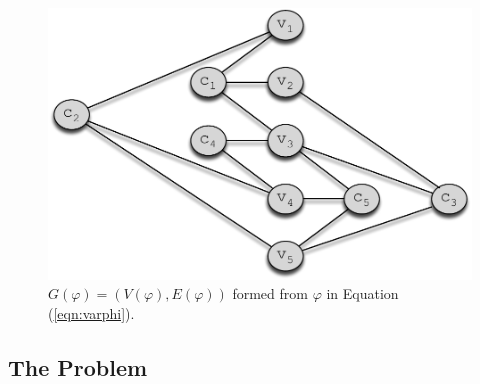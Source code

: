 \begin{figure}[t]
\centering
\includegraphics[scale=0.53]{figs/gvarphi.pdf}
\caption{$G(\varphi)=(V(\varphi),E(\varphi))$ formed from $\varphi$ in Equation (\ref{eqn:varphi}). }
\label{fig:gvarphi}
\end{figure}


\subsection{The \full Problem}
\label{subsec:full}


